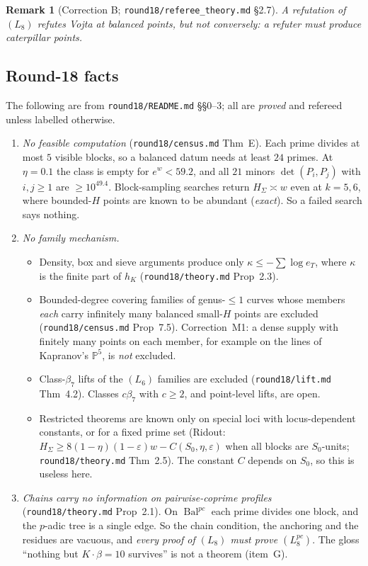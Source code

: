 \documentclass[11pt]{article}
\newtheorem{remark}[theorem]{Remark}
\newcommand{\PP}{\mathbb P}
\newcommand{\Bal}{\operatorname{Bal}}
\newcommand{\rec}[1]{\texttt{#1}}
\begin{document}
\begin{remark}[Correction B; \rec{round18/referee\_theory.md} \S2.7]
A refutation of \((L_8)\) refutes Vojta at balanced points, but not
conversely: a refuter must produce caterpillar points.
\end{remark}

\subsection{Round-18 facts}

The following are from \rec{round18/README.md} \S\S0--3; all are
\emph{proved} and refereed unless labelled otherwise.
\begin{enumerate}[leftmargin=2em]
  \item \emph{No feasible computation} (\rec{round18/census.md} Thm~E).  Each
    prime divides at most \(5\) visible blocks, so a balanced datum needs at
    least \(24\) primes.  At \(\eta=0.1\) the class is empty for
    \(e^w<59.2\), and all \(21\) minors \(\det(P_i,P_j)\) with \(i,j\ge1\) are
    \(\ge10^{49.4}\).  Block-sampling searches return \(H_\Sigma\asymp w\) even
    at \(k=5,6\), where bounded-\(H\) points are known to be abundant
    (\emph{exact}).  So a failed search says nothing.
  \item \emph{No family mechanism.}
    \begin{itemize}
      \item Density, box and sieve arguments produce only
        \(\kappa\le-\sum\log e_T\), where \(\kappa\) is the finite part of
        \(h_K\) (\rec{round18/theory.md} Prop~2.3).
      \item Bounded-degree covering families of genus-\(\le1\) curves whose
        members \emph{each} carry infinitely many balanced small-\(H\) points
        are excluded (\rec{round18/census.md} Prop~7.5).  Correction~M1: a
        dense supply with finitely many points on each member, for example on
        the lines of Kapranov's \(\PP^5\), is \emph{not} excluded.
      \item Class-\(\beta_7\) lifts of the \((L_6)\) families are excluded
        (\rec{round18/lift.md} Thm~4.2).  Classes \(c\beta_7\) with \(c\ge2\),
        and point-level lifts, are open.
      \item Restricted theorems are known only on special loci with
        locus-dependent constants, or for a fixed prime set (Ridout:
        \(H_\Sigma\ge8(1-\eta)(1-\varepsilon)w-C(S_0,\eta,\varepsilon)\) when all
        blocks are \(S_0\)-units; \rec{round18/theory.md} Thm~2.5).  The
        constant \(C\) depends on \(S_0\), so this is useless here.
    \end{itemize}
  \item \emph{Chains carry no information on pairwise-coprime profiles}
    (\rec{round18/theory.md} Prop~2.1).  On \(\Bal^{pc}\) each prime divides
    one block, and the \(p\)-adic tree is a single edge.  So the chain
    condition, the anchoring and the residues are vacuous, and \emph{every
    proof of \((L_8)\) must prove \((L_8^{pc})\)}.  The gloss ``nothing but
    \(K\cdot\beta=10\) survives'' is not a theorem (item~G).
\end{enumerate}
\end{document}
